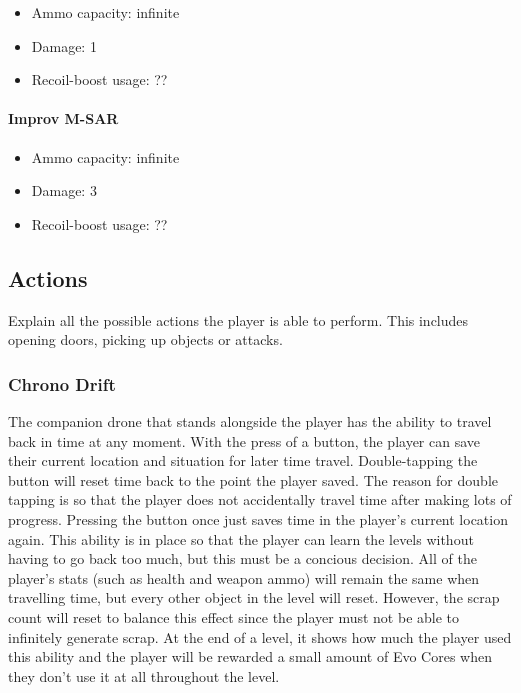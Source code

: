 \documentclass[12pt]{article}
\begin{document}
\begin{itemize}
	\item Ammo capacity: infinite
	\item Damage: 1
	\item Recoil-boost usage: ??
\end{itemize}

\paragraph{Improv M-SAR} 

\begin{itemize}
	\item Ammo capacity: infinite
	\item Damage: 3
	\item Recoil-boost usage: ??
\end{itemize}

\subsection{Actions}

Explain all the possible actions the player is able to perform. This includes opening doors, picking up objects or attacks.

\subsubsection{Chrono Drift}

The companion drone that stands alongside the player has the ability to travel back in time at any moment. With the press of a button, the player can save their current location and situation for later time travel. Double-tapping the button will reset time back to the point the player saved. The reason for double tapping is so that the player does not accidentally travel time after making lots of progress. Pressing the button once just saves time in the player's current location again. This ability is in place so that the player can learn the levels without having to go back too much, but this must be a concious decision. All of the player's stats (such as health and weapon ammo) will remain the same when travelling time, but every other object in the level will reset. However, the scrap count will reset to balance this effect since the player must not be able to infinitely generate scrap. At the end of a level, it shows how much the player used this ability and the player will be rewarded a small amount of Evo Cores when they don't use it at all throughout the level. 
\end{document}
